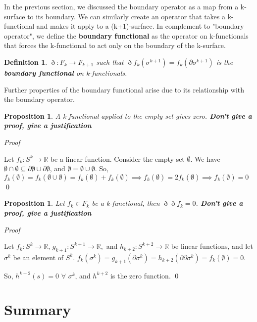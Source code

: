 \documentclass{book}
\newtheorem{defn}[equation]{Definition}
\newtheorem{prop}[equation]{Proposition}
\renewenvironment{proof}{\emph{Proof}}{\qed}
\begin{document}
In the previous section, we discussed the boundary operator as a map from a k-surface to its boundary. We can similarly create an operator that takes a k-functional and makes it apply to a (k+1)-surface. In complement to "boundary operator", we define the \textbf{boundary functional} as the operator on k-functionals that forces the k-functional to act only on the boundary of the k-surface. 

\begin{defn}
	$\eth : F_k \to F_{k+1}$ such that $\eth f_k(\sigma^{k+1}) = f_k(\partial \sigma^{k+1})$ is the \textbf{boundary functional} on k-functionals. 
\end{defn}

Further properties of the boundary functional arise due to its relationship with the boundary operator.


\begin{prop}
	A k-functional applied to the empty set gives zero. \textbf{\textit{Don't give a proof, give a justification}}
\end{prop}
\begin{proof}
	
	Let $f_k : S^k \to \mathbb{R}$ be a linear function. Consider the empty set $\emptyset$. 
We have $\emptyset \cap \emptyset \subseteq \partial\emptyset \cup \partial\emptyset$, and $\emptyset = \emptyset\cup\emptyset$. 
So, $f_k(\emptyset) = f_k(\emptyset\cup\emptyset) = f_k(\emptyset) + f_k(\emptyset) \implies f_k(\emptyset) = 2f_k(\emptyset) \implies f_k(\emptyset) = 0$
\end{proof}



\begin{prop}
	Let $f_k \in F_k$ be a k-functional, then $\eth\eth f_k = 0 $. \textbf{\textit{Don't give a proof, give a justification}}
	
	
\end{prop}
\begin{proof}

	Let $f_k : S^k \to \mathbb{R}$, $g_{k+1} : S^{k+1} \to \mathbb{R},$ and $h_{k+2}: S^{k+2} \to \mathbb{R}$ be linear functions, and let $\sigma^k$ be an element of $S^k$. $f_k(\sigma^k) = g_{k+1}(\partial \sigma^k) = h_{k+2}(\partial\partial \sigma^k) = f_k(\emptyset) = 0$. 
	
	So, $h^{k+2}(s) = 0$ $\forall$ $\sigma^k$, and $h^{k+2}$ is the zero function. 
\end{proof}

\section{Summary}
\end{document}
